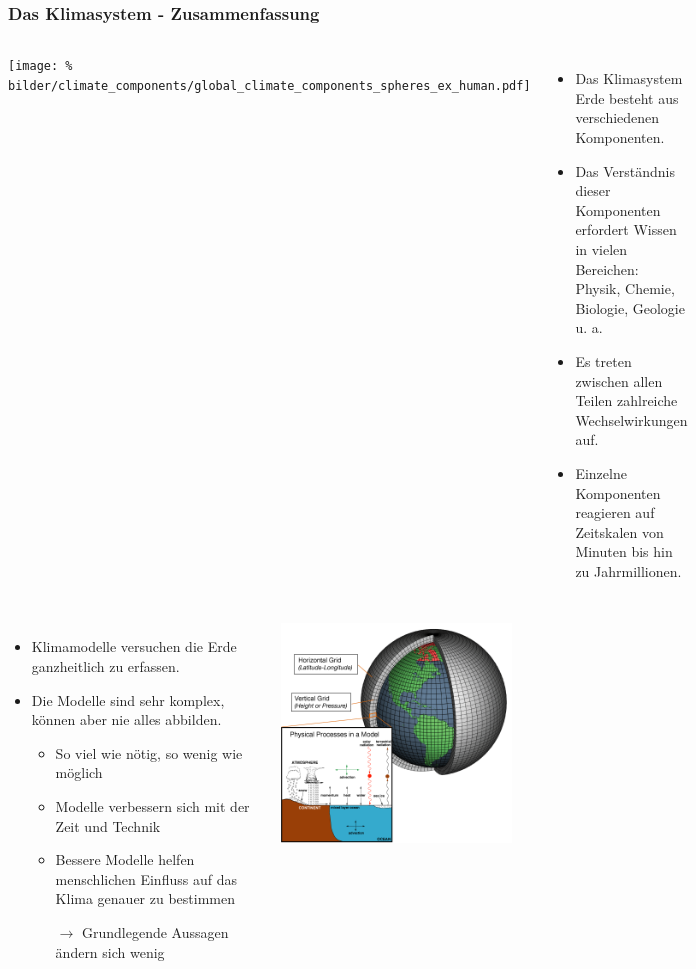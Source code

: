 \begin{frame}
	\frametitle{Das Klimasystem - Zusammenfassung}

	\begin{columns}
			\texttt{[image: \%
					bilder/climate\_components/global\_climate\_components\_spheres\_ex\_human.pdf]}
			\begin{itemize}
				\item Das Klimasystem Erde besteht aus verschiedenen Komponenten.
				\item Das Verständnis dieser Komponenten erfordert Wissen in vielen Bereichen: Physik, Chemie, Biologie, Geologie u. a.
				\item Es treten zwischen allen Teilen zahlreiche Wechselwirkungen auf.
				\item Einzelne Komponenten reagieren auf Zeitskalen von Minuten bis hin zu Jahrmillionen.
			\end{itemize}
		\end{columns}
		\begin{columns}
			\column{0.7\linewidth}
			\begin{itemize}
				\item Klimamodelle versuchen die Erde ganzheitlich zu erfassen.
				\item Die Modelle sind sehr komplex, können aber nie alles abbilden.
				\begin{itemize}
					\item So viel wie nötig, so wenig wie möglich
					\item Modelle verbessern sich mit der Zeit und Technik
					\item Bessere Modelle helfen menschlichen Einfluss auf das Klima genauer zu bestimmen
					\item[$\rightarrow$] Grundlegende Aussagen ändern sich wenig
				\end{itemize}
			\end{itemize}
			\column{0.3\linewidth}
				\includegraphics[width=0.9\linewidth]{bilder/AtmosphericModelSchematic.png}
		\end{columns}


\end{frame}
